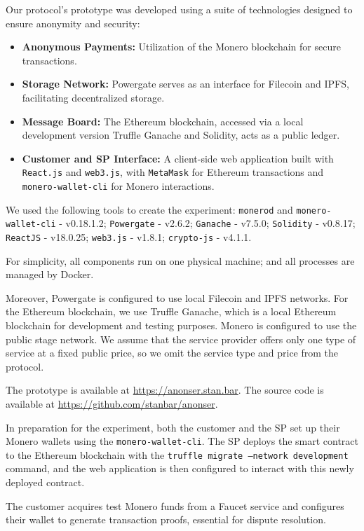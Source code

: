 \documentclass[pdftex,twocolumn,epjc3]{svjour3}
\begin{document}
{Our protocol's prototype was developed using a suite of technologies designed to ensure anonymity and security:

\begin{itemize}
  \item \textbf{Anonymous Payments:} Utilization of the Monero blockchain for secure transactions.
  \item \textbf{Storage Network:} Powergate serves as an interface for Filecoin and IPFS, facilitating decentralized storage.
  \item \textbf{Message Board:} The Ethereum blockchain, accessed via a local development version Truffle Ganache and Solidity, acts as a public ledger.
  \item \textbf{Customer and SP Interface:} A client-side web application built with \texttt{React.js} and \texttt{web3.js}, with \texttt{MetaMask} for Ethereum transactions and \texttt{monero-wallet-cli} for Monero interactions.
\end{itemize}

We used the following tools to create the experiment:
\texttt{monerod} and \texttt{monero-wallet-cli} - v0.18.1.2; \texttt{Powergate} - v2.6.2; \texttt{Ganache} - v7.5.0; \texttt{Solidity} - v0.8.17; \texttt{ReactJS} - v18.0.25; \texttt{web3.js} - v1.8.1; \texttt{crypto-js} - v4.1.1.

For simplicity, all components run on one physical machine; and all processes are managed by Docker. 

Moreover, Powergate is configured to use local Filecoin and IPFS networks.
For the Ethereum blockchain, we use Truffle Ganache, which is a local Ethereum blockchain for development and testing purposes. 
Monero is configured to use the public stage network.
We assume that the service provider offers only one type of service at a fixed public price, so we omit the service type and price from the protocol.

The prototype is available at \url{https://anonser.stan.bar}. The source code is available at \url{https://github.com/stanbar/anonser}.

In preparation for the experiment, both the customer and the SP set up their Monero wallets using the \texttt{monero-wallet-cli}. The SP deploys the smart contract to the Ethereum blockchain with the \texttt{truffle migrate --network development} command, and the web application is then configured to interact with this newly deployed contract.

The customer acquires test Monero funds from a Faucet service and configures their wallet to generate transaction proofs, essential for dispute resolution.

}
\end{document}
